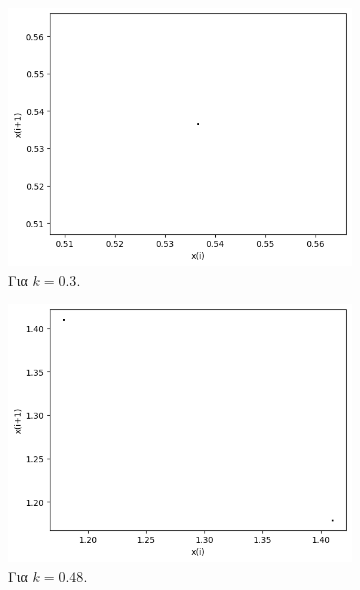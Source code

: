 \begin{figure}[h!]
	\centering
	\begin{subfigure}[b]{0.4\textwidth}
		\centering
		\includegraphics[width=\textwidth]{LateX images/graphs q05/g3}
		\caption{Για $k=0.3$.}
		\label{f:k27}
	\end{subfigure}
	\hfill
	\begin{subfigure}[b]{0.4\textwidth}
		\centering
		\includegraphics[width=\textwidth]{LateX images/graphs q05/g4}
		\caption{Για $k=0.48$.}
		\label{f:k28}
	\end{subfigure}
	\hfill
	\begin{subfigure}[b]{0.4\textwidth}
		\centering

\end{subfigure}
\end{figure}
